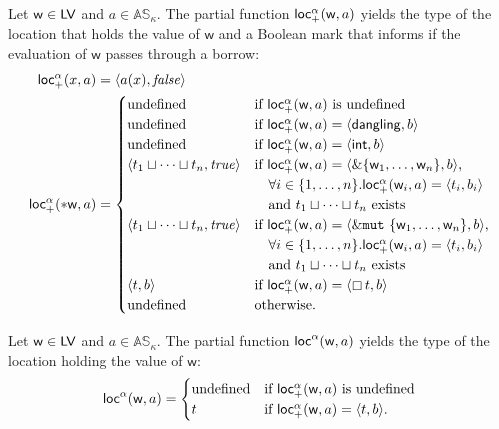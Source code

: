 \begin{definition}\label{def:abstract_location_for_reading}
  Let $\mathsf{w}\in\mathsf{LV}$ and $a\in\mathbb{AS}_\kappa$. The partial function
  $\mathsf{loc_+^\alpha}(\mathsf{w},a)$ yields the type of the location that holds the value of $\mathsf{w}$
  and a Boolean mark that informs if the evaluation of $\mathsf{w}$ passes through a borrow:
  \begin{align*}
    \mathsf{loc_+^\alpha}(x,a)&=\langle a(x),\mathit{false}\rangle\\
    \mathsf{loc_+^\alpha}(*\mathsf{w},a)&=\begin{cases}
    \text{undefined} & \text{if $\mathsf{loc_+^\alpha}(\mathsf{w},a)$ is undefined}\\
    \text{undefined} & \text{if $\mathsf{loc_+^\alpha}(\mathsf{w},a)=\langle\mathsf{dangling},b\rangle$}\\
    \text{undefined} & \text{if $\mathsf{loc_+^\alpha}(\mathsf{w},a)=\langle\mathsf{int},b\rangle$}\\
    \langle t_1\sqcup\cdots\sqcup t_n,\mathit{true}\rangle & \text{if $\mathsf{loc_+^\alpha}(\mathsf{w},a)=\langle\&\{\mathsf{w}_1,\ldots,\mathsf{w}_n\},b\rangle$,}\\
    &\quad\text{$\forall i\in\{1,\ldots,n\}.\mathsf{loc_+^\alpha}(\mathsf{w}_i,a)=\langle t_i,b_i\rangle$}\\
    &\quad\text{and $t_1\sqcup\cdots\sqcup t_n$ exists}\\
    \langle t_1\sqcup\cdots\sqcup t_n,\mathit{true}\rangle & \text{if $\mathsf{loc_+^\alpha}(\mathsf{w},a)=\langle\&\mathtt{mut}\ \{\mathsf{w}_1,\ldots,\mathsf{w}_n\},b\rangle$,}\\
    &\quad\text{$\forall i\in\{1,\ldots,n\}.\mathsf{loc_+^\alpha}(\mathsf{w}_i,a)=\langle t_i,b_i\rangle$}\\
    &\quad\text{and $t_1\sqcup\cdots\sqcup t_n$ exists}\\
    \langle t,b\rangle & \text{if $\mathsf{loc_+^\alpha}(\mathsf{w},a)=\langle\boxempty\,{t},b\rangle$}\\
    \text{undefined} & \text{otherwise.}
    \end{cases}
  \end{align*}
\end{definition}

\begin{definition}\label{def:abstract_location}
  Let $\mathsf{w}\in\mathsf{LV}$ and $a\in\mathbb{AS}_\kappa$. The partial function
  $\mathsf{loc}^\alpha(\mathsf{w},a)$ yields the type of the location holding the value of $\mathsf{w}$:
  \[
  \mathsf{loc}^\alpha(\mathsf{w},a)=\begin{cases}
  \text{undefined} & \text{if $\mathsf{loc_+^\alpha}(\mathsf{w},a)$ is undefined}\\
  t & \text{if $\mathsf{loc_+^\alpha}(\mathsf{w},a)=\langle t,b\rangle$.}
  \end{cases}
  \]
\end{definition}

